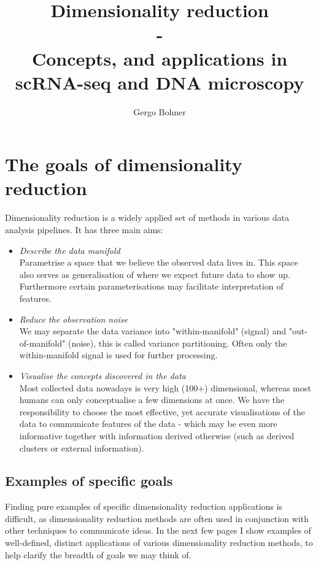 \documentclass[11pt]{article}
\title{Dimensionality reduction \\ - \\ Concepts, and applications in scRNA-seq and DNA microscopy}
\author{Gergo Bohner}
\begin{document}
\maketitle


\section{The goals of dimensionality reduction}

Dimensionality reduction is a widely applied set of methods in various data analysis pipelines. It has three main aims:

\begin{itemize}
	\item \emph{Describe the data manifold} \\ Parametrise a space that we believe the observed data lives in. This space also serves as generalisation of where we expect future data to show up. Furthermore certain parameterisations  may facilitate interpretation of features.
	\item \emph{Reduce the observation noise} \\ We may separate the data variance into "within-manifold" (signal) and "out-of-manifold" (noise), this is called variance partitioning. Often only the within-manifold signal is used for further processing.
	\item \emph{Visualise the concepts discovered in the data} \\ Most collected data nowadays is very high (100+) dimensional, whereas most humans can only conceptualise a few dimensions at once. We have the responsibility to choose the most effective, yet accurate visualisations of the data to communicate features of the data - which may be even more informative together with information derived otherwise (such as derived clusters or external information).
\end{itemize} 



\subsection{Examples of specific goals}

Finding pure examples of specific dimensionality reduction applications is difficult, as dimensionality reduction methods are often used in conjunction with other techniques to communicate ideas. In the next few pages I show examples of well-defined, distinct applications of various dimensionality reduction methods, to help clarify the breadth of goals we may think of.
 
\end{document}
